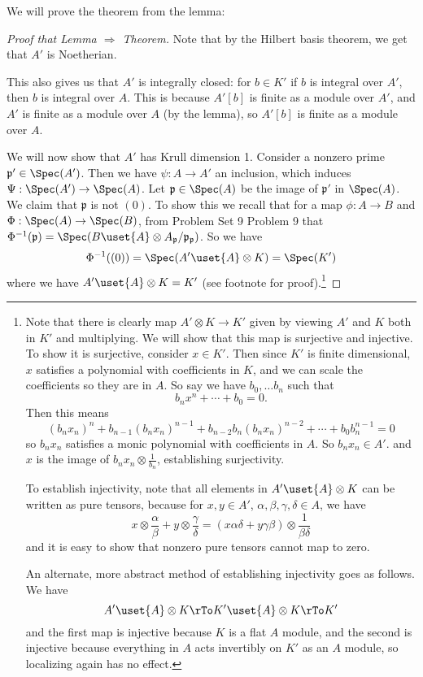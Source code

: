 \documentclass[12 pt]{article}
\theoremstyle{definition}
\newcommand\fp{{\mathfrak p}}
\begin{document}
We will prove the theorem from the lemma:
\begin{proof}[Proof that Lemma $\Rightarrow$ Theorem]
Note that by the Hilbert basis theorem, we get that $A'$ is Noetherian.

This also gives us that $A'$ is integrally closed: for $b \in K'$ if $b$ is integral over $A'$, then $b$ is integral over $A$. This is because $A'[b]$ is finite as a module over $A'$, and $A'$ is finite as a module over $A$ (by the lemma), so $A'[b]$ is finite as a module over $A$.

We will now show that $A'$ has Krull dimension 1. Consider a nonzero prime $\fp' \in \Spec(A')$. Then we have $\psi:A \to A'$ an inclusion, which induces $\Psi:\Spec(A') \to \Spec(A)$. Let $\fp \in \Spec(A)$ be the image of $\fp'$ in $\Spec(A)$. We claim that $\fp$ is not $(0)$. To show this we recall that for a map $\phi:A \to B$ and $\Phi:\Spec(A) \to \Spec(B)$, from Problem Set 9 Problem 9 that $\Phi^{-1}(\fp)=\Spec(B \uset{A}\otimes A_{\fp}/\fp_\fp)$. So we have
\[\Phi^{-1}((0))=\Spec(A' \uset{A}\otimes K)=\Spec(K')\]
where we have $A' \uset{A}\otimes K = K'$ (see footnote for proof).\footnote{Note that there is clearly map $A' \otimes K \to K'$ given by viewing $A'$ and $K$ both in $K'$ and multiplying. We will show that this map is surjective and injective. To show it is surjective, consider $x \in K'$. Then since $K'$ is finite dimensional, $x$ satisfies a polynomial with coefficients in $K$, and we can scale the coefficients so they are in $A$. So say we have $b_0, \ldots b_n$ such that
\[b_nx^n +\cdots +b_0=0.\]
Then this means
\[(b_nx_n)^n+b_{n-1}(b_nx_n)^{n-1}+b_{n-2}b_n(b_nx_n)^{n-2}+\cdots+b_0b_n^{n-1}=0\]
so $b_nx_n$ satisfies a monic polynomial with coefficients in $A$. So $b_nx_n \in A'$. and $x$ is the image of $b_nx_n \otimes \frac{1}{b_n}$, establishing surjectivity.

To establish injectivity, note that all elements in $A' \uset{A}\otimes K$ can be written as pure tensors, because for $x,y \in A'$, $\alpha, \beta, \gamma, \delta \in A$, we have
\[x \otimes \frac{\alpha}{\beta}+y \otimes \frac{\gamma}{\delta}=(x\alpha \delta+y \gamma \beta)\otimes \frac{1}{\beta \delta}\]
and it is easy to show that nonzero pure tensors cannot map to zero.

An alternate, more abstract method of establishing injectivity goes as follows. We have
\[A' \uset{A}\otimes K \rTo K' \uset{A}\otimes K \rTo K'\]
and the first map is injective because $K$ is a flat $A$ module, and the second is injective because everything in $A$ acts invertibly on $K'$ as an $A$ module, so localizing again has no effect.}


\end{proof}
\end{document}
